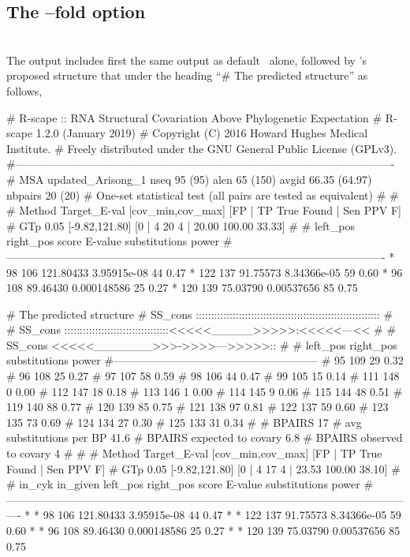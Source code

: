 \subsection{The --fold option}

\\

\noindent
The output includes first the same output as default \rscape\ alone,
followed by \rscape's proposed structure that under the heading ``\#
The predicted structure'' as follows,

\begin{sreoutput}
# R-scape :: RNA Structural Covariation Above Phylogenetic Expectation
# R-scape 1.2.0 (January 2019)
# Copyright (C) 2016 Howard Hughes Medical Institute.
# Freely distributed under the GNU General Public License (GPLv3).
#-------------------------------------------------------------------------------------------------------
# MSA updated_Arisong_1 nseq 95 (95) alen 65 (150) avgid 66.35 (64.97) nbpairs 20 (20)
# One-set statistical test (all pairs are tested as equivalent) 
#
#
# Method Target_E-val [cov_min,cov_max] [FP | TP True Found | Sen PPV F] 
# GTp    0.05         [-9.82,121.80]     [0 | 4 20 4 | 20.00 100.00 33.33] 
#
#       left_pos       right_pos        score          E-value       substitutions      power
#-------------------------------------------------------------------------------------------------------
*	      98	     106	121.80433	3.95915e-08	44		0.47
*	     122	     137	91.75573	8.34366e-05	59		0.60
*	      96	     108	89.46430	0.000148586	25		0.27
*	     120	     139	75.03790	0.00537656	85		0.75

# The predicted structure
# SS_cons ::::::::::::::::::::::::::::::::::::::::::::::::::::::::::::
#
# SS_cons ::::::::::::::::::::::::::::::::::<<<<<_____>>>>>:<<<<<---<<
#
# SS_cons <<<<<_______>>>->>>>--->>>>>::
#
# left_pos      right_pos    substitutions      power
#--------------------------------------------------------
# 95		109		29		0.32
# 96		108		25		0.27
# 97		107		58		0.59
# 98		106		44		0.47
# 99		105		15		0.14
# 111		148		0		0.00
# 112		147		18		0.18
# 113		146		1		0.00
# 114		145		9		0.06
# 115		144		48		0.51
# 119		140		88		0.77
# 120		139		85		0.75
# 121		138		97		0.81
# 122		137		59		0.60
# 123		135		73		0.69
# 124		134		27		0.30
# 125		133		31		0.34
#
# BPAIRS 17
# avg substitutions per BP  41.6
# BPAIRS expected to covary 6.8
# BPAIRS observed to covary 4
#
#
# Method Target_E-val [cov_min,cov_max] [FP | TP True Found | Sen PPV F] 
# GTp    0.05         [-9.82,121.80]     [0 | 4 17 4 | 23.53 100.00 38.10] 
#
# in_cyk in_given   left_pos       right_pos      score           E-value    substitutions      power
#----------------------------------------------------------------------------------------------------------------
*	*	        98	       106	121.80433	3.95915e-08	44		0.47
*	*	       122	       137	91.75573	8.34366e-05	59		0.60
*	*	        96	       108	89.46430	0.000148586	25		0.27
*	*	       120	       139	75.03790	0.00537656	85		0.75
\end{sreoutput}


